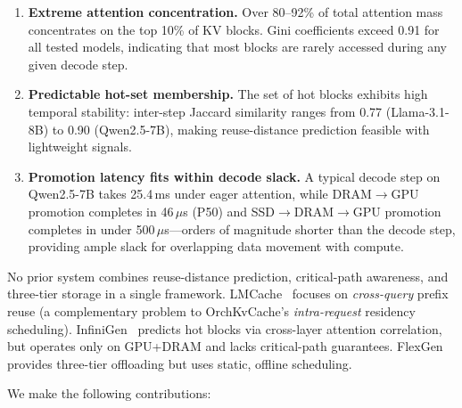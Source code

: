 \documentclass[acmsmall,nonacm,screen]{acmart}
\newcommand{\sys}{OrchKvCache}
\begin{document}
\begin{enumerate}
  \item \textbf{Extreme attention concentration.}
    Over 80--92\% of total attention mass concentrates on the top 10\% of
    KV blocks.  Gini coefficients exceed 0.91 for all tested models,
    indicating that most blocks are rarely accessed during any given decode
    step.

  \item \textbf{Predictable hot-set membership.}
    The set of hot blocks exhibits high temporal stability: inter-step
    Jaccard similarity ranges from 0.77 (Llama-3.1-8B) to 0.90 (Qwen2.5-7B),
    making reuse-distance prediction feasible with lightweight signals.

  \item \textbf{Promotion latency fits within decode slack.}
    A typical decode step on Qwen2.5-7B takes 25.4\,ms under eager attention,
    while DRAM$\to$GPU promotion completes in 46\,$\mu$s (P50) and
    SSD$\to$DRAM$\to$GPU promotion completes in under 500\,$\mu$s---orders
    of magnitude shorter than the decode step, providing ample slack for
    overlapping data movement with compute.
\end{enumerate}

No prior system combines reuse-distance prediction, critical-path awareness,
and three-tier storage in a single framework.  LMCache~\cite{yao2024lmcache}
focuses on \emph{cross-query} prefix reuse (a complementary problem to
\sys{}'s \emph{intra-request} residency scheduling).
InfiniGen~\cite{lee2024infinigen} predicts hot blocks via cross-layer
attention correlation, but operates only on GPU+DRAM and lacks
critical-path guarantees.  FlexGen~\cite{sheng2023flexgen} provides
three-tier offloading but uses static, offline scheduling.

We make the following contributions:
\end{document}
